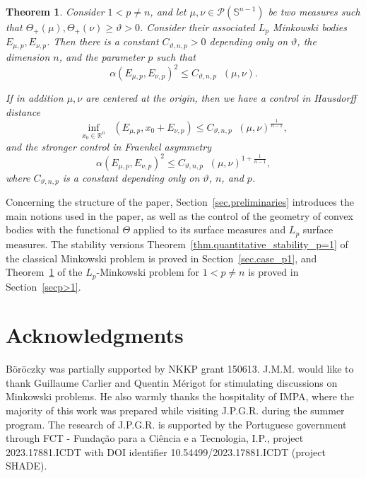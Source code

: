 \documentclass[a4paper, 10pt, twoside]{amsart}
\numberwithin{equation}{section}
\newcommand{\theoname}{Theorem}
\theoremstyle{plain}
\newtheorem{theorem}{\theoname}[section]
\theoremstyle{definition}
\DeclareMathOperator{\dc}{\mathrm{d}_\mathrm{C}}
\DeclareMathOperator{\dH}{\mathrm{d}_\mathrm{H}}
\begin{document}
\begin{theorem}\label{thm.quantitative_stability_p}
    Consider $1 < p \neq n$, and let $\mu, \nu \in \mathscr{P}(\mathbb{S}^{n-1})$ be two measures such that $\Theta_+(\mu), \Theta_+(\nu) \ge \vartheta >0$. Consider their associated $L_p$ Minkowski bodies $E_{\mu,p}, E_{\nu,p}$. Then there is a constant $C_{\vartheta,n,p} >0$ depending only on $\vartheta$, the dimension $n$, and the parameter $p$ such that 
    \begin{equation}
        {\alpha(E_{\mu,p}, E_{\nu,p})}^2
        \le 
        C_{\vartheta,n,p} {\dc(\mu, \nu)}.
    \end{equation}

    If in addition $\mu,\nu$ are centered at the origin, then we have a control in Hausdorff distance
    \begin{equation*}
        \inf_{x_0 \in \mathbb{R}^n} 
        \dH(E_{\mu,p}, x_0 + E_{\nu,p}) 
        \le C_{\vartheta,n,p} {\dc(\mu,\nu)}^{\frac{1}{n-1}},
    \end{equation*}
    and the stronger control in Fraenkel asymmetry
    \begin{equation*}
        {\alpha(E_{\mu,p}, E_{\nu,p})}^2
        \le 
        C_{\vartheta,n,p} {\dc(\mu, \nu)}^{1 + \frac{1}{n-1}},
    \end{equation*}
    where $C_{\vartheta,n,p}$ is a constant depending only on $\vartheta$, $n$, and $p$.
\end{theorem}

Concerning the structure of the paper, Section~\ref{sec.preliminaries} introduces the main notions used in the paper, as well as the control of the geometry of convex bodies with the functional $\Theta$ applied to its surface measures and $L_p$ surface measures. The stability versions Theorem~\ref{thm.quantitative_stability_p=1} of the classical Minkowski problem is proved in Section~\ref{sec.case_p1}, and Theorem~\ref{thm.quantitative_stability_p} of the $L_p$-Minkowski problem for $1< p \neq n$ is proved in Section~\ref{secp>1}.

\section*{Acknowledgments}
B\"or\"oczky was partially supported by NKKP grant 150613. J.M.M. would like to thank Guillaume Carlier and Quentin Mérigot for stimulating discussions on Minkowski problems. He also warmly thanks the hospitality of IMPA, where the majority of this work was prepared while visiting J.P.G.R. during the summer program. The research of J.P.G.R. is supported by the Portuguese government through FCT - Fundação para a Ciência e a Tecnologia, I.P., project 2023.17881.ICDT with DOI identifier 10.54499/2023.17881.ICDT (project SHADE). 
\end{document}
